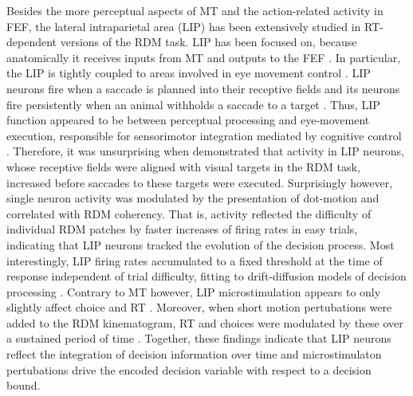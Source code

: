 Besides the more perceptual aspects of MT and the action-related activity in FEF, the lateral intraparietal area (LIP) has been extensively studied in RT-dependent versions of the RDM task. LIP has been focused on, because anatomically it receives inputs from MT and outputs to the FEF \parencite{Andersen1992,Blatt1990,Lewis2000}. In particular, the LIP is tightly coupled to areas involved in eye movement control \parencite{Andersen1990}. LIP neurons fire when a saccade is planned into their receptive fields \parencite{Andersen1987} and its neurons fire persistently when an animal withholds a saccade to a target \parencite{Barash1991,Gnadt1988}. Thus, LIP function appeared to be between perceptual processing and eye-movement execution, responsible for sensorimotor integration mediated by cognitive control \parencite[for review,][]{Andersen2002}. Therefore, it was unsurprising when \textcite{Shadlen1996,Shadlen2001} demonstrated that activity in LIP neurons, whose receptive fields were aligned with visual targets in the RDM task, increased before saccades to these targets were executed. Surprisingly however, single neuron activity was modulated by the presentation of dot-motion and correlated with RDM coherency. That is, activity reflected the difficulty of individual RDM patches by faster increases of firing rates in easy trials, indicating that LIP neurons tracked the evolution of the decision process. Most interestingly, LIP firing rates accumulated to a fixed threshold at the time of response independent of trial difficulty, fitting to drift-diffusion models of decision processing \parencite{Roitman2002a,Shadlen1996,Shadlen2001}. Contrary to MT however, LIP microstimulation appears to only slightly affect choice and RT \parencite{Hanks2006}. Moreover, when short motion pertubations were added to the RDM kinematogram, RT and choices were modulated by these over a sustained period of time \parencite{Huk2005}. Together, these findings indicate that LIP neurons reflect the integration of decision information over time and microstimulaton pertubations drive the encoded decision variable with respect to a decision bound. 

